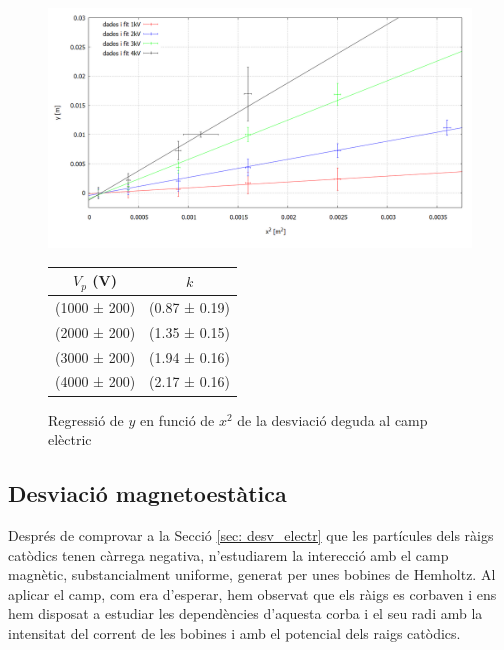 \documentclass[11pt]{article}
\begin{document}
\begin{figure}[h]
    \centering
    \begin{minipage}{0.45\textwidth}
    \centering
        \includegraphics[width=1\linewidth]{Plot yvsx.PNG}
        \caption{Regressió de $y$ en funció de $x^2$  de la desviació deguda al camp elèctric}
        \label{fig: Regressió Desv E}
    \end{minipage}
    \hfill
    \begin{minipage}{0.45\textwidth} 
        \centering
        \begin{tabular}{|c|c|}
            \hline
            $V_p$ (V)	&	$k$	\\\hline
            (1000 ± 200)	&	(0.87 ± 0.19)   \\\hline
            (2000 ± 200)	&	(1.35 ± 0.15)	\\\hline
            (3000 ± 200)	&	(1.94 ± 0.16)	\\\hline
            (4000 ± 200)	&	(2.17 ± 0.16)	\\\hline           
        \end{tabular}
        \label{tab:kvsVp}
    \end{minipage}
\end{figure}

\subsection{Desviació magnetoestàtica}\label{sec: desv_magn}
Després de comprovar a la Secció \ref{sec: desv_electr} que les partícules dels ràigs catòdics tenen càrrega negativa, n'estudiarem la interecció amb el camp magnètic, substancialment uniforme, generat per unes bobines de Hemholtz. 
Al aplicar el camp, com era d'esperar, hem observat que els ràigs es corbaven i ens hem disposat a estudiar les dependències d'aquesta corba i el seu radi amb la intensitat del corrent de les bobines i amb el potencial dels raigs catòdics.
\end{document}
